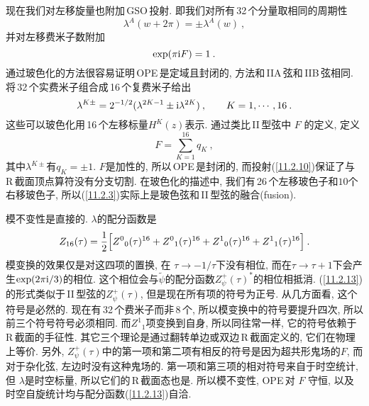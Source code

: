 现在我们对左移旋量也附加\,GSO\,投射. 即我们对所有\,32\,个分量取相同的周期性
\begin{equation}
    \lambda^{A}(w+2\pi)=\pm\lambda^{A}(w)  \:, \label{11.2.9}
\end{equation}
并对左移费米子数附加
\begin{equation}
    \exp(\pi\mathrm{i} F)=1\:. \label{11.2.10}
\end{equation}
通过玻色化的方法很容易证明\,OPE\,是定域且封闭的, 方法和\,IIA\,弦和\,IIB\,弦相同. 将\,32\,个实费米子组合成\,16\,个复费米子给出
\begin{equation}
    \lambda^{K\pm}=2^{-1/2}(\lambda^{2K-1}\pm\mathrm{i}\lambda^{2K})\:, \qquad K=1,\cdots,16 \:. \label{11.2.11}
\end{equation}
这些可以玻色化用\,16\,个左移标量$ H^{K}(z) $表示. 通过类比\,II\,型弦中 $F$ 的定义, 定义
\begin{equation}
    F=\sum_{K=1}^{16}q_{K} \:, \label{11.2.12}
\end{equation}
其中$ \lambda^{K\pm} $有$ q_{K}=\pm1$. $F $是加性的, 所以\,OPE\,是封闭的, 而投射(\ref{11.2.10})保证了与\,R\,截面顶点算符没有分支切割. 在玻色化的描述中, 我们有\,26\,个左移玻色子和$ 10 $个右移玻色子, 所以(\ref{11.2.3})实际上是玻色弦和\,II\,型弦的融合(fusion). 

模不变性是直接的. $\lambda $的配分函数是
\begin{equation}
    Z_{16}(\tau)= \frac{1}{2}\Bigl[
    Z^{0}{}_{0}(\tau)^{16}+ Z^{0}{}_{1}(\tau)^{16}+Z^{1}{}_{0}(\tau)^{16}+Z^{1}{}_{1}(\tau)^{16}
    \Bigr] \:. \label{11.2.13}
\end{equation}
模变换的效果仅是对这四项的置换, 在 $\tau\to -1/\tau $下没有相位, 而在$ \tau\to\tau+1 $下会产生$ \exp(2\pi\mathrm{i}/3) $的相位. 这个相位会与$ \tilde{\psi} $的配分函数$ Z_{\psi}^{+}(\tau)^{\ast} $的相位相抵消. (\ref{11.2.13})的形式类似于\,II\,型弦的$ Z_{\psi}^{+}(\tau)$, 但是现在所有项的符号为正号. 从几方面看, 这个符号是必然的. 现在有\,32\,个费米子而非\,8\,个, 所以模变换中的符号要提升四次, 所以前三个符号符号必须相同. 而$ Z^{1}{}_{1} $项变换到自身, 所以同往常一样, 它的符号依赖于\,R\,截面的手征性. 其它三个理论是通过翻转单边或双边\,R\,截面定义的, 它们在物理上等价. 另外, $Z_{\psi}^{+}(\tau) $中的第一项和第二项有相反的符号是因为超共形鬼场的$ F$, 而对于杂化弦, 左边时没有这种鬼场的. 第一项和第三项的相对符号来自于时空统计, 但 $\lambda $是时空标量, 所以它们的\,R\,截面态也是. 所以模不变性, OPE\,对 $F$ 守恒, 以及时空自旋统计均与配分函数(\ref{11.2.13})自洽.

